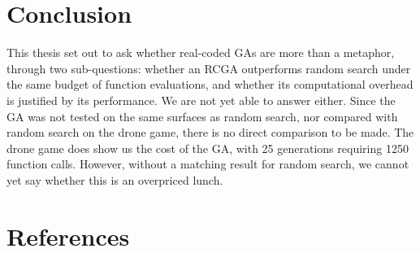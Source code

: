 \documentclass[
  a4paper,
  DIV=11,
  numbers=noendperiod]{scrartcl}
\newcommand{\+}{\phantom{-}}
\begin{document}
\section{Conclusion}\label{conclusion}

This thesis set out to ask whether real-coded GAs are more than a
metaphor, through two sub-questions: whether an RCGA outperforms random
search under the same budget of function evaluations, and whether its
computational overhead is justified by its performance. We are not yet
able to answer either. Since the GA was not tested on the same surfaces
as random search, nor compared with random search on the drone game,
there is no direct comparison to be made. The drone game does show us
the cost of the GA, with 25 generations requiring 1250 function calls.
However, without a matching result for random search, we cannot yet say
whether this is an overpriced lunch.

\newpage

\section{References}\label{references}
\end{document}
